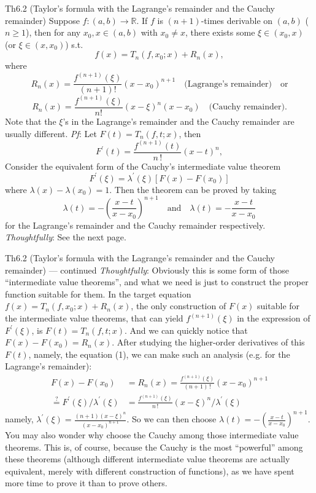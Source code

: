 \documentclass{article}
\begin{document}
\begin{Th}{Th6.2 (Taylor's formula with the Lagrange's remainder and the Cauchy remainder)}
    Suppose $f: (a,b)\rightarrow\mathbb{R}$. If $f$ is $(n+1)$-times derivable on $(a,b)$ ($n\geq 1$), then for any $x_0, x\in(a,b)$ with $x_0\neq x$, there exists some $\xi\in (x_0,x)$ (or $\xi\in (x,x_0)$) s.t.
    $$ f(x) = T_n(f,x_0;x) + R_n(x), $$
    where 
    $$ R_n(x) = \frac{f^{(n+1)}(\xi)}{(n+1)!} (x-x_0)^{n+1} \quad \text{(Lagrange's remainder)} \quad \text{or} $$
    $$ R_n(x) = \frac{f^{(n+1)}(\xi)}{n!} (x-\xi)^n (x-x_0) \quad \text{(Cauchy remainder)}. $$
    Note that the $\xi$'s in the Lagrange's remainder and the Cauchy remainder are usually different.
    \tcblower
    \textit{Pf}: Let $F(t) = T_n(f,t;x)$, then
    \begin{equation}
        F^\prime (t) = \frac{f^{(n+1)}(t)}{n\,!}(x-t)^n, \tag{1}
    \end{equation}
    Consider the equivalent form of the Cauchy's intermediate value theorem
    $$ F^\prime (\xi) = \lambda^\prime (\xi) [F(x) - F(x_0)] $$
    where $\lambda(x) - \lambda(x_0) = 1$. Then the theorem can be proved by taking
    $$ \lambda(t) = -\left(\frac{x-t}{x-x_0}\right)^{n+1} \quad\text{and}\quad\lambda(t) = -\frac{x-t}{x-x_0} $$
    for the Lagrange's remainder and the Cauchy remainder respectively. \\
    \textcolor{P}{\textit{Thoughtfully}: See the next page.}
\end{Th}

\begin{Th}{Th6.2 (Taylor's formula with the Lagrange's remainder and the Cauchy remainder) — continued}
    \textcolor{P}{\textit{Thoughtfully}: Obviously this is some form of those ``intermediate value theorems'', and what we need is just to construct the proper function suitable for them. In the target equation $f(x) = T_n(f,x_0;x) + R_n(x)$, the only construction of $F(x)$ suitable for the intermediate value theorems, that can yield $f^{(n+1)}(\xi)$ in the expression of $F^\prime(\xi)$, is $F(t) = T_n(f,t;x)$. And we can quickly notice that $F(x) - F(x_0) = R_n(x)$. After studying the higher-order derivatives of this $F(t)$, namely, the equation (1), we can make such an analysis (e.g. for the Lagrange's remainder):
    $$
    \begin{aligned}
        F(x) - F(x_0) &= R_n(x) = \frac{f^{(n+1)}(\xi)}{(n+1)\,!} (x-x_0)^{n+1} \\
        \overset{?}{=} F^\prime(\xi) / \lambda^\prime(\xi) &= \frac{f^{(n+1)}(\xi)}{n\,!}(x-\xi)^n \Big/ \lambda^\prime(\xi)
    \end{aligned}
    $$
    namely, $\lambda^\prime(\xi) = \frac{(n+1)(x-\xi)^n}{(x-x_0)^{n+1}}$. So we can then choose $ \lambda(t) = -\left(\frac{x-t}{x-x_0}\right)^{n+1} $. \\
    You may also wonder why choose the Cauchy among those intermediate value theorems. This is, of course, because the Cauchy is the most ``powerful'' among these theorems (although different intermediate value theorems are actually equivalent, merely with different construction of functions), as we have spent more time to prove it than to prove others.
    }
\end{Th}
\end{document}

